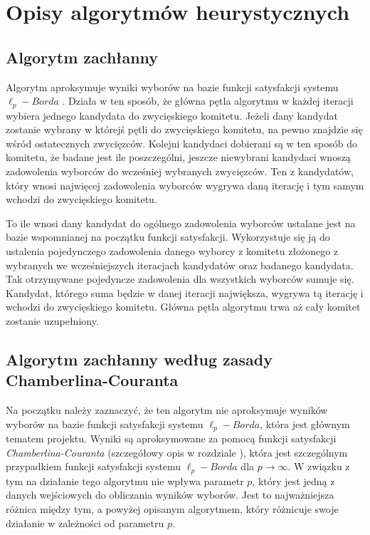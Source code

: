 \documentclass[polish,11pt]{aghthesis}
\begin{document}
\newpage
\section{Opisy algorytmów heurystycznych}
\subsection{Algorytm zachłanny}
Algorytm aproksymuje wyniki wyborów na bazie funkcji satysfakcji systemu $\ell_p-Borda$ .
Działa w ten sposób, że główna pętla algorytmu w każdej iteracji wybiera jednego kandydata
do zwycięskiego komitetu. Jeżeli dany kandydat zostanie wybrany w którejś pętli do
zwycięskiego komitetu, na pewno znajdzie się wśród ostatecznych zwycięzców. Kolejni
kandydaci dobierani są w ten sposób do komitetu, że badane jest ile poszczególni, jeszcze
niewybrani kandydaci wnoszą zadowolenia wyborców do wcześniej wybranych zwycięzców.
Ten z kandydatów, który wnosi najwięcej zadowolenia wyborców wygrywa daną iterację i
tym samym wchodzi do zwycięskiego komitetu. 

To ile wnosi dany kandydat do ogólnego zadowolenia wyborców ustalane jest na bazie
wspomnianej na początku funkcji satysfakcji. Wykorzystuje się ją do ustalenia pojedynczego zadowolenia danego wyborcy z komitetu złożonego z wybranych we wcześniejszych
iteracjach kandydatów oraz badanego kandydata. Tak otrzymywane pojedyncze
zadowolenia dla wszystkich wyborców sumuje się. Kandydat, którego suma będzie w danej
iteracji największa, wygrywa tą iterację i wchodzi do zwycięskiego komitetu. Główna pętla
algorytmu trwa aż cały komitet zostanie uzupełniony.

\subsection{Algorytm zachłanny według zasady Chamberlina-Couranta}
Na początku należy zaznaczyć, że ten algorytm nie aproksymuje wyników wyborów na bazie
funkcji satysfakcji systemu $\ell_p-Borda$, która jest głównym tematem projektu. Wyniki są
aproksymowane za pomocą funkcji satysfakcji \textit{Chamberlina-Couranta} (szczegółowy opis w
rozdziale \textit{}), która jest szczególnym przypadkiem funkcji satysfakcji systemu $\ell_p-Borda$ dla $p \to \infty$. W związku z tym na działanie tego algorytmu nie wpływa parametr $p$, który jest jedną z danych wejściowych do obliczania wyników wyborów. Jest to najważniejsza różnica między tym, a powyżej opisanym algorytmem, który różnicuje swoje działanie w zależności od parametru $p$.
\end{document}
